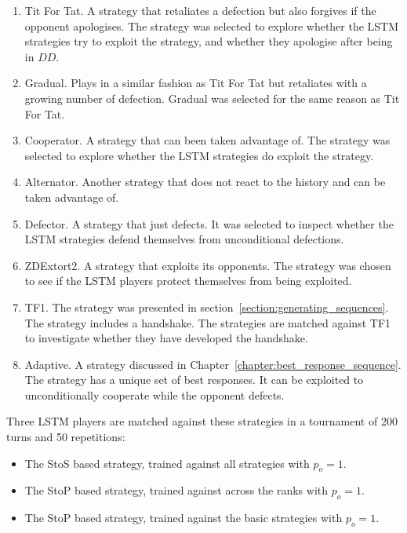 \begin{enumerate}
    \item Tit For Tat. A strategy that retaliates
    a defection but also forgives if the opponent apologises. The strategy was
    selected to explore whether the LSTM strategies try to exploit the strategy,
    and whether they apologise after being in \(DD\).
    \item Gradual. Plays in a similar fashion as Tit For Tat but
    retaliates with a growing number of defection. Gradual was selected for the
    same reason as Tit For Tat.
    \item Cooperator. A strategy that can been taken advantage
    of. The strategy was selected to explore whether the LSTM strategies do
    exploit the strategy.
    \item Alternator. Another strategy that does not react to the history
    and can be taken advantage of.
    \item Defector. A strategy that just defects. It was selected to inspect
    whether the LSTM strategies defend themselves from unconditional defections.
    \item ZDExtort2. A strategy that exploits its opponents. The
    strategy was chosen to see if the LSTM players protect themselves from being
    exploited.
    \item TF1. The strategy was presented in
    section~\ref{section:generating_sequences}. The strategy includes a
    handshake. The strategies are matched against TF1 to investigate whether they
    have developed the handshake.
    \item Adaptive. A strategy discussed in
    Chapter~\ref{chapter:best_response_sequence}. The strategy has a unique set
    of best responses. It can be exploited to unconditionally cooperate while
    the opponent defects.
\end{enumerate} 

Three LSTM players are matched against these strategies in a tournament of
200 turns and 50 repetitions:

\begin{itemize}
    \item The StoS based strategy, trained against all strategies with $p_o=1$.
    \item The StoP based strategy, trained against across the ranks with $p_o=1$.
    \item The StoP based strategy, trained against the basic strategies with $p_o=1$.
\end{itemize}

